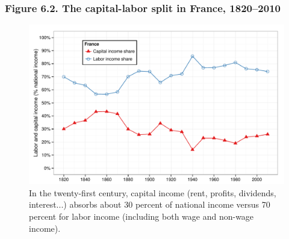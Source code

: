 \documentclass[t]{beamer}\usepackage[]{graphicx}\usepackage[]{color}
\newenvironment{knitrout}{}{} %
\begin{document}
\begin{frame}[label=Figure_6_2]
\frametitle{Figure 6.2. The capital-labor split in France, 1820--2010}
\begin{figure}[t]
\begin{minipage}[b]{\textwidth}
\centering
\begin{knitrout}\footnotesize
{}\color{fgcolor}

{\centering \includegraphics[width=1\linewidth]{figures/color/Figure_6_2} 

}



\end{knitrout}
\caption{In the twenty-first century, capital income (rent, profits, dividends, interest...) absorbs about 30 percent of national income versus 70 percent for labor income (including both wage and non-wage income).}
\end{minipage}
\end{figure}
\end{frame}
\end{document}
